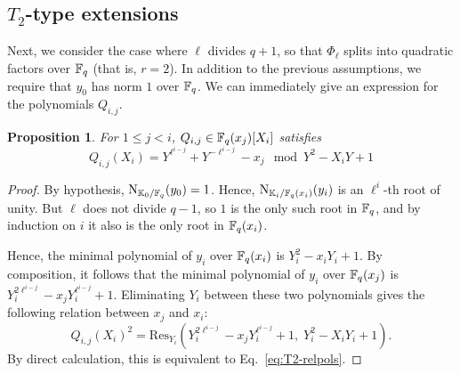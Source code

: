 \documentclass{sig-alternate}
\newtheorem{proposition}[definition]{Proposition}
\begin{document}

\subsection{$T_2$-type extensions}
\label{ssec:T2}

Next, we consider the case where $\ell$ divides $q+1$, so that
$\Phi_\ell$ splits into quadratic factors over $\mathbb{F}_q$ (that is,
$r=2$). In addition to the previous assumptions, we require that $y_0$
has norm $1$ over $\mathbb{F}_q$. We can immediately give an expression for
the polynomials $Q_{i,j}$.

\begin{proposition}
  \label{th:T2-resultant}
  For $1 \le j < i$, $Q_{i,j} \in \mathbb{F}_q(x_{j})[X_i]$ satisfies
  \begin{equation}
    \label{eq:T2-relpols}
    Q_{i,j}(X_i) = Y^{\ell^{i-j}} + Y^{-\ell^{i-j}} - x_j \mod Y^2-X_iY+1
  \end{equation}
\end{proposition}
\begin{proof}
  By hypothesis, $\operatorname{N}_{\mathbb{K}_0/\mathbb{F}_q}(y_0)=1$. Hence,
  $\operatorname{N}_{\mathbb{K}_i/\mathbb{F}_q(x_i)}(y_i)$ is an $\ell^i$-th root of unity. But $\ell$
  does not divide $q-1$, so $1$ is the only such root in $\mathbb{F}_q$, and
  by induction on $i$ it also is the only root in $\mathbb{F}_q(x_i)$.

  Hence, the minimal polynomial of $y_i$ over $\mathbb{F}_q(x_i)$ is $Y_i^2
  -x_i Y_i +1$.  By composition, it follows that the minimal
  polynomial of $y_i$ over $\mathbb{F}_q(x_{j})$ is $Y_i^{2\ell^{i-j}}-x_{j}
  Y_i^{\ell^{i-j}}+1$. Eliminating $Y_i$ between these two polynomials
  gives the following relation between $x_{j}$ and $x_i$:
  \begin{equation*}
    Q_{i,j}(X_i)^2 = \mathrm{Res}_{Y_i}(Y_i^{2\ell^{i-j}}-x_{j}Y_i^{\ell^{i-j}}+1,\; Y_i^2-X_i Y_i+1).
  \end{equation*}
  By direct calculation, this is equivalent to
  Eq.~\eqref{eq:T2-relpols}.
\end{proof}
\end{document}
